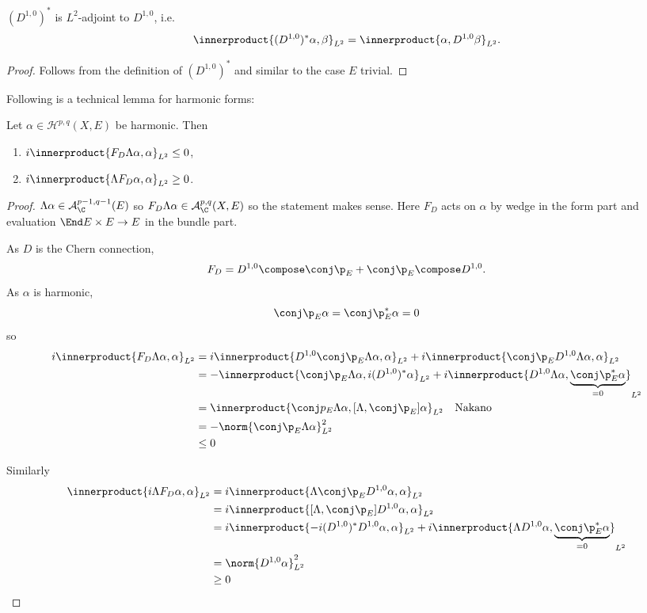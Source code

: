 \documentclass[a4paper]{article}
\newcommand*{\ip}{\innerproduct}
\begin{document}
\begin{lemma}
  \((D^{1, 0})^*\) is \(L^2\)-adjoint to \(D^{1, 0}\), i.e.
  \[
    \ip{(D^{1, 0})^*\alpha, \beta}_{L^2} = \ip{\alpha, D^{1, 0} \beta}_{L^2}.
  \]
\end{lemma}

\begin{proof}
  Follows from the definition of \((D^{1, 0})^*\) and similar to the case \(E\) trivial.
\end{proof}

Following is a technical lemma for harmonic forms:
\begin{lemma}
  Let \(\alpha \in \mathcal H^{p, q}(X, E)\) be harmonic. Then
  \begin{enumerate}
  \item \(i \ip{F_D \Lambda \alpha, \alpha}_{L^2} \leq 0\),
  \item \(i \ip{\Lambda F_D \alpha, \alpha}_{L^2} \geq 0\).
  \end{enumerate}
\end{lemma}

\begin{proof}
  \(\Lambda \alpha \in \mathcal A^{p - 1, q - 1}_\C(E)\) so \(F_D \Lambda \alpha \in \mathcal A^{p, q}_\C(X, E)\) so the statement makes sense. Here \(F_D\) acts on \(\alpha\) by wedge in the form part and evaluation \(\End E \times E \to E\) in the bundle part.

  As \(D\) is the Chern connection,
  \[
    F_D = D^{1, 0} \compose \conj \p_E + \conj \p_E \compose D^{1, 0}.
  \]
  As \(\alpha\) is harmonic,
  \[
    \conj \p_E \alpha = \conj \p_E^* \alpha = 0
  \]
  so
  \begin{align*}
    i \ip{F_D \Lambda \alpha, \alpha}_{L^2}
    &= i \ip{D^{1, 0} \conj \p_E \Lambda \alpha, \alpha}_{L^2} + i \ip{\conj \p_E D^{1, 0} \Lambda \alpha, \alpha}_{L^2} \\
    &= - \ip{\conj \p_E \Lambda \alpha, i(D^{1, 0})^* \alpha}_{L^2} + i \ip{D^{1, 0} \Lambda \alpha, \underbrace{\conj \p_E^* \alpha}_{= 0}}_{L^2} \\
    &= \ip{\conj p_E \Lambda \alpha, [\Lambda, \conj \p_E] \alpha}_{L^2} \quad \text{Nakano} \\
    &= -\norm{\conj \p_E \Lambda \alpha}_{L^2}^2 \\
    &\leq 0
  \end{align*}

  Similarly
  \begin{align*}
    \ip{i \Lambda F_D \alpha, \alpha}_{L^2}
    &= i\ip{\Lambda \conj \p_E D^{1, 0}\alpha, \alpha}_{L^2} \\
    &= i\ip{[\Lambda, \conj \p_E] D^{1, 0} \alpha, \alpha}_{L^2} \\
    &= i\ip{-i (D^{1, 0})^* D^{1, 0}\alpha, \alpha}_{L^2} + i\ip{\Lambda D^{1, 0}\alpha, \underbrace{\conj \p_E^* \alpha}_{=0}}_{L^2} \\
    &= \norm{D^{1, 0} \alpha}_{L^2}^2 \\
    &\geq 0
  \end{align*}
\end{proof}
\end{document}
